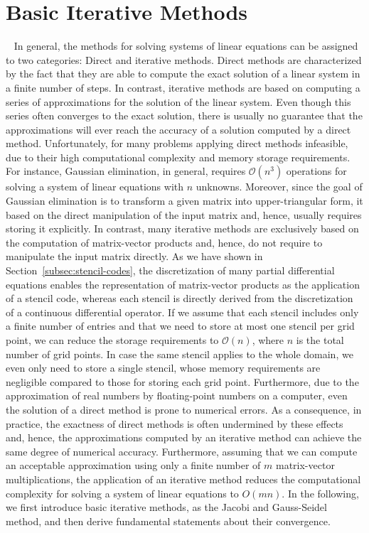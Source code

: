 \section{Basic Iterative Methods}~\label{section:basic-iterative-methods}
In general, the methods for solving systems of linear equations can be assigned to two categories: Direct and iterative methods.
Direct methods are characterized by the fact that they are able to compute the exact solution of a linear system in a finite number of steps.
In contrast, iterative methods are based on computing a series of approximations for the solution of the linear system.
Even though this series often converges to the exact solution, there is usually no guarantee that the approximations will ever reach the accuracy of a solution computed by a direct method.
Unfortunately, for many problems applying direct methods infeasible, due to their high computational complexity and memory storage requirements.
For instance, Gaussian elimination, in general, requires $\mathcal O(n^3)$ operations for solving a system of linear equations with $n$ unknowns.
Moreover, since the goal of Gaussian elimination is to transform a given matrix into upper-triangular form, it based on the direct manipulation of the input matrix and, hence, usually requires storing it explicitly.
In contrast, many iterative methods are exclusively based on the computation of matrix-vector products and, hence, do not require to manipulate the input matrix directly.
As we have shown in Section~\ref{subsec:stencil-codes}, the discretization of many partial differential equations enables the representation of matrix-vector products as the application of a stencil code, whereas each stencil is directly derived from the discretization of a continuous differential operator.
If we assume that each stencil includes only a finite number of entries and that we need to store at most one stencil per grid point, we can reduce the storage requirements to $\mathcal{O}(n)$, where $n$ is the total number of grid points.
In case the same stencil applies to the whole domain, we even only need to store a single stencil, whose memory requirements are negligible compared to those for storing each grid point.
Furthermore, due to the approximation of real numbers by floating-point numbers on a computer, even the solution of a direct method is prone to numerical errors.
As a consequence, in practice, the exactness of direct methods is often undermined by these effects and, hence, the approximations computed by an iterative method can achieve the same degree of numerical accuracy.%
Furthermore, assuming that we can compute an acceptable approximation using only a finite number of $m$ matrix-vector multiplications, the application of an iterative method reduces the computational complexity for solving a system of linear equations to $O(mn)$.
In the following, we first introduce basic iterative methods, as the Jacobi and Gauss-Seidel method, and then derive fundamental statements about their convergence. 
